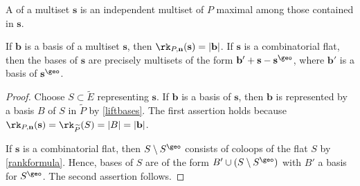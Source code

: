 A  of a multiset $\mathbf s$ is an independent multiset of $P$ maximal among those contained in $\mathbf s$.
\begin{lemm}\label{indeprank}
  If $\mathbf b$ is a basis of a multiset $\mathbf s$, then $\rk_{P, \mathbf n}(\mathbf s) = |\mathbf b|$.
  If $\mathbf s$ is a combinatorial flat, then the bases of $\mathbf s$ are precisely multisets of the form $\mathbf b' + \mathbf s - \mathbf s^\geo$, where $\mathbf b'$ is a basis of $\mathbf s^\geo$.
\end{lemm}
\begin{proof}
  Choose $S \subset \widetilde E$ representing $\mathbf s$.
  If $\mathbf b$ is a basis of $\mathbf s$,
  then $\mathbf b$ is represented by a basis $B$ of $S$ in $\widetilde P$ by \cref{liftbases}.
  The first assertion holds because $\rk_{P, \mathbf n}(\mathbf s) = \rk_{\widetilde P}(S) = |B| = |\mathbf b|$.

  If $\mathbf s$ is a combinatorial flat, then $S \setminus S^\geo$ consists of coloops of the flat $S$ by \cref{rankformula}.
  Hence, bases of $S$ are of the form $B' \cup (S \setminus S^\geo)$ with $B'$ a basis for $S^\geo$.
  The second assertion follows.
\end{proof}

